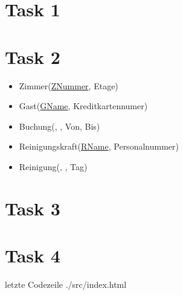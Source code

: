 
\newcommand{\dozent}{Prof. Dr. Agnès Voisard \\ Nicolas Lehmann}					%
\newcommand{\tutor}{Toni Draßdo}						%
\newcommand{\tutoriumNo}{03}				%
\newcommand{\ubungNo}{014}									%
\newcommand{\veranstaltung}{Datenbanksysteme}	%
\newcommand{\semester}{SoSe 18}						%
\newcommand{\studenten}{Eduard Beiline, Mark Niehues, Antoen Oehler}			%

\usepackage[normalem]{ulem}



\section{Task 1}

\section{Task 2}
\begin{itemize}
  \item Zimmer(\underline{ZNummer}, Etage)
  \item Gast(\underline{GName}, Kreditkartennumer)
  \item Buchung(, , Von, Bis)
  \item Reinigungskraft(\underline{RName}, Personalnummer)
  \item Reinigung(, , Tag)
\end{itemize}

\section{Task 3}

\section{Task 4}
 letzte Codezeile
{./src/index.html}

